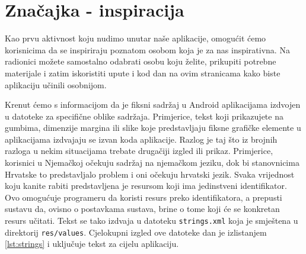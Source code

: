 \documentclass[11pt,a4paper,twoside]{article}
\begin{document}

\section{Značajka - inspiracija}

Kao prvu aktivnost koju nudimo unutar naše aplikacije, omogućit ćemo korisnicima da se inspiriraju poznatom osobom koja je za nas inspirativna. Na radionici možete samostalno odabrati osobu koju želite, prikupiti potrebne materijale i zatim iskoristiti upute i kod dan na ovim stranicama kako biste aplikaciju učinili osobnijom. 

Krenut ćemo s informacijom da je fiksni sadržaj u Android aplikacijama izdvojen u datoteke za specifične oblike sadržaja. Primjerice, tekst koji prikazujete na gumbima, dimenzije margina ili slike koje predstavljaju fiksne grafičke elemente u aplikacijama izdvajaju se izvan koda aplikacije. Razlog je taj što iz brojnih razloga u nekim situacijama trebate drugačiji izgled ili prikaz. Primjerice, korisnici u Njemačkoj očekuju sadržaj na njemačkom jeziku, dok bi stanovnicima Hrvatske to predstavljalo problem i oni očekuju hrvatski jezik. Svaka vrijednost koju kanite rabiti predstavljena je resursom koji ima jedinstveni identifikator. Ovo omogućuje programeru da koristi resurs preko identifikatora, a prepusti sustavu da, ovisno o postavkama sustava, brine o tome koji će se konkretan resurs učitati. Tekst se tako izdvaja u datoteku \texttt{strings.xml} koja je smještena u direktorij \texttt{res/values}. Cjelokupni izgled ove datoteke dan je izlistanjem \ref{lst:strings} i uključuje tekst za cijelu aplikaciju.
\end{document}
